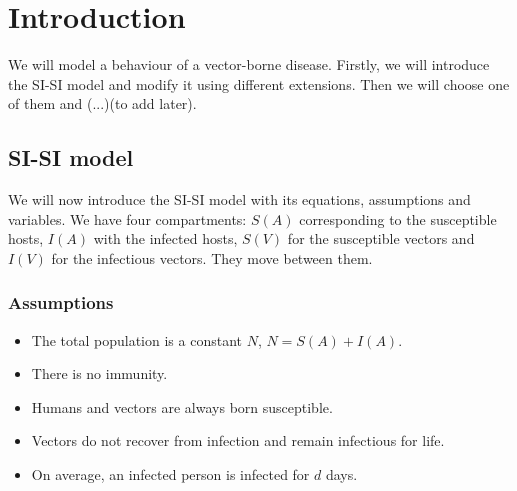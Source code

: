 


\section{Introduction} \label{introduction}
We will model a behaviour of a vector-borne disease. Firstly, we will introduce the SI-SI model and modify it using different extensions. Then we will choose one of them and (...)(to add later).
\subsection{SI-SI model}
We will now introduce the SI-SI model with its equations, assumptions and variables.
We have four compartments: $S(A)$ corresponding to the susceptible hosts, $I(A)$ with the infected hosts, $S(V)$ for the susceptible vectors and $I(V)$ for the infectious vectors. They move between them.
\subsubsection{Assumptions} \label{SISI-assumptions}
\begin{itemize}
    \item The total population is a constant $N$, $N = S(A)+I(A)$.
    \item There is no immunity.
    \item Humans and vectors are always born susceptible.
    \item Vectors do not recover from infection and remain infectious for life.
    \item On average, an infected person is infected for $d$ days.
\end{itemize}
